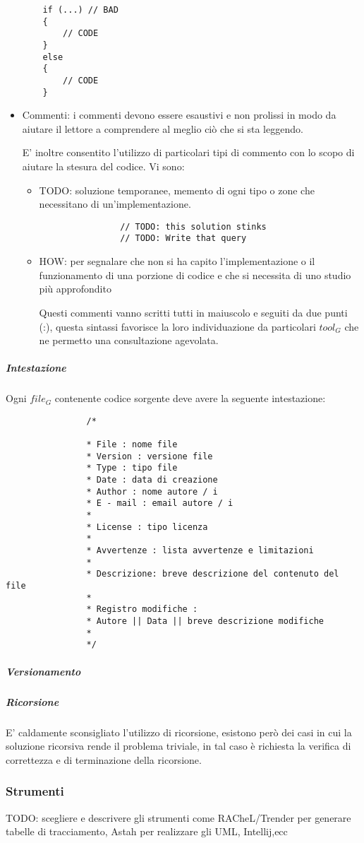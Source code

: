 \begin{itemize}
\begin{lstlisting}
	if (...) // BAD
	{
	 	// CODE
	}
	else 
	{
		// CODE
	}
\end{lstlisting}

			\item Commenti: i commenti devono essere esaustivi e non prolissi in modo da aiutare il lettore a comprendere al meglio ciò che si sta leggendo.
			
			
			E' inoltre consentito l'utilizzo di particolari tipi di commento con lo scopo di aiutare la stesura del codice. Vi sono:
			\begin{itemize}
				\item TODO: soluzione temporanee, memento di ogni tipo o zone che necessitano di un'implementazione.
				\begin{lstlisting}
				// TODO: this solution stinks
				// TODO: Write that query
				\end{lstlisting}
				
				\item HOW: per segnalare che non si ha capito l'implementazione o il funzionamento di una porzione di codice e che si necessita di uno studio più approfondito
%				
				
				Questi commenti vanno scritti tutti in maiuscolo e seguiti da due punti (:), questa sintassi favorisce la loro individuazione da particolari $tool_G$ che ne permetto una consultazione agevolata.
			\end{itemize}

			\end{itemize}
			\subparagraph{Intestazione}
			Ogni $file_G$ contenente codice sorgente deve avere la seguente intestazione:
			\begin{lstlisting}
				/*
				
				* File : nome file
				* Version : versione file
				* Type : tipo file
				* Date : data di creazione
				* Author : nome autore / i
				* E - mail : email autore / i
				*
				* License : tipo licenza				
				*				
				* Avvertenze : lista avvertenze e limitazioni
				*
				* Descrizione: breve descrizione del contenuto del file
				*
				* Registro modifiche :
				* Autore || Data || breve descrizione modifiche
				*
				*/
			\end{lstlisting}
			\subparagraph{Versionamento}
			\subparagraph{Ricorsione}
			E' caldamente sconsigliato l'utilizzo di ricorsione, esistono però dei casi in cui la soluzione ricorsiva rende il problema triviale, in tal caso è richiesta la verifica di correttezza e di terminazione della ricorsione.
	\subsubsection{Strumenti}
	TODO: scegliere e descrivere gli strumenti come RACheL/Trender  per generare tabelle di tracciamento, Astah per realizzare gli UML, Intellij,ecc

			
			
